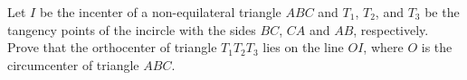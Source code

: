 Let $I$ be the incenter of a non-equilateral triangle $ABC$ and $T_1$, $T_2$, and $T_3$ be the tangency points of the incircle with the sides $BC$, $CA$ and $AB$, respectively. Prove that the orthocenter of triangle $T_1T_2T_3$ lies on the line $OI$, where $O$ is the circumcenter of triangle $ABC$.

